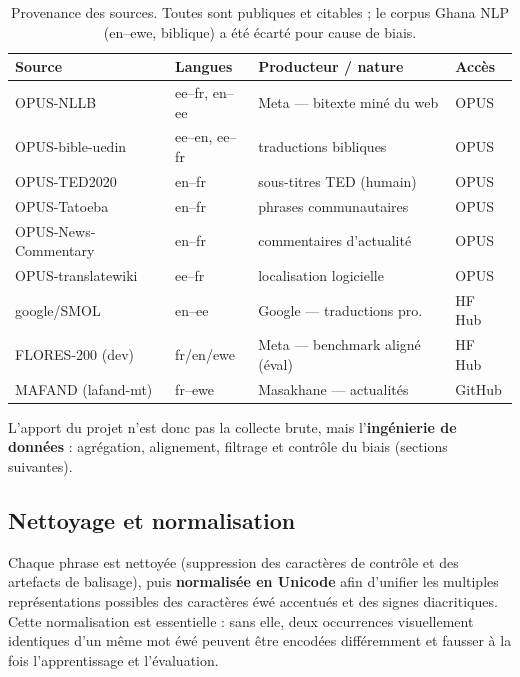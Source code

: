 \documentclass[11pt,a4paper]{article}
\begin{document}
\begin{table}[H]
\centering\small
{}
\renewcommand{\arraystretch}{1.2}
\caption{Provenance des sources. Toutes sont publiques et citables ; le corpus Ghana NLP (en–ewe, biblique) a été écarté pour cause de biais.}
\begin{tabularx}{\textwidth}{l l X l}
\toprule
\rowcolor{light}
\textbf{Source} & \textbf{Langues} & \textbf{Producteur / nature} & \textbf{Accès} \\
\midrule
OPUS-NLLB            & ee–fr, en–ee & Meta — bitexte miné du web      & OPUS \\
OPUS-bible-uedin     & ee–en, ee–fr & traductions bibliques           & OPUS \\
OPUS-TED2020         & en–fr        & sous-titres TED (humain)        & OPUS \\
OPUS-Tatoeba         & en–fr        & phrases communautaires          & OPUS \\
OPUS-News-Commentary & en–fr        & commentaires d'actualité        & OPUS \\
OPUS-translatewiki   & ee–fr        & localisation logicielle         & OPUS \\
google/SMOL          & en–ee        & Google — traductions pro.       & HF Hub \\
FLORES-200 (dev)     & fr/en/ewe    & Meta — benchmark aligné (éval)  & HF Hub \\
MAFAND (lafand-mt)   & fr–ewe       & Masakhane — actualités          & GitHub \\
\bottomrule
\end{tabularx}
\end{table}

L'apport du projet n'est donc pas la collecte brute, mais l'\textbf{ingénierie de
données} : agrégation, alignement, filtrage et contrôle du biais (sections suivantes).

\subsection{Nettoyage et normalisation}
Chaque phrase est nettoyée (suppression des caractères de contrôle et des artefacts de
balisage), puis \textbf{normalisée en Unicode} afin d'unifier les multiples
représentations possibles des caractères éwé accentués et des signes diacritiques. Cette
normalisation est essentielle : sans elle, deux occurrences visuellement identiques d'un
même mot éwé peuvent être encodées différemment et fausser à la fois l'apprentissage et
l'évaluation.
\end{document}
